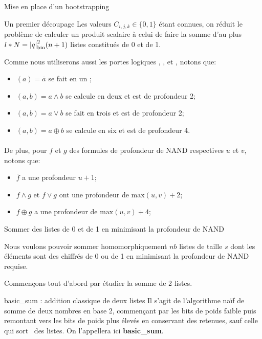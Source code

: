 \begin{section}{Mise en place d'un bootstrapping}
\begin{subsection}{Un premier découpage}
	Les valeurs $C_{i,j,k} \in \{0,1\}$ étant connues, on réduit le problème de
	calculer un produit scalaire à celui de faire la somme d'au plus $l * N
	= {|q|}_{\text{bin}}^2 (n+1)$ listes constitués de 0 et de 1.

	Comme nous utiliserons aussi les portes logiques , ,  et , notons que:
\begin{itemize}
\item {}$(a) = \overline{a}$ se fait en un ;
\item {}$(a, b) = a \land b$ se calcule en deux  et est de
	profondeur 2;
\item {}$(a, b) = a \lor b$ se fait en trois  et est de
	profondeur 2;
\item {}$(a, b) = a \oplus b$ se calcule en six  et est de
	profondeur 4.
\end{itemize}

\paragraph{}
De plus, pour $f$ et $g$ des formules de profondeur de NAND respectives $u$ et
$v$, notons que:
\begin{itemize}
\item $\overline{f}$ a une profondeur $u+1$;
\item $f \land g$ et $f \lor g$ ont une profondeur de $\text{max}(u,v) + 2$;
\item $f \oplus g$ a une profondeur de $\text{max}(u,v) + 4$;
\end{itemize}
\end{subsection}
\begin{subsection}{Sommer des listes de 0 et de 1 en minimisant la profondeur de NAND}

	Nous voulons pouvoir sommer homomorphiquement $nb$ listes de taille $s$ dont les éléments sont des chiffrés de 0 ou de 1 en minimisant la profondeur de NAND requise.

Commençons tout d'abord par étudier la somme de 2 listes.

\begin{subsubsection}{basic\_sum : addition classique de deux listes}
	Il s'agit de l'algorithme naïf de somme de deux nombres en base 2, commençant par les bits de poids faible puis remontant vers les bits de poids plus élevés en conservant des retenues, sauf celle qui \og sort \fg \ des listes. On l'appellera ici \textbf{basic\_sum}. 
	

\end{subsubsection}
\end{subsection}
\end{section}
